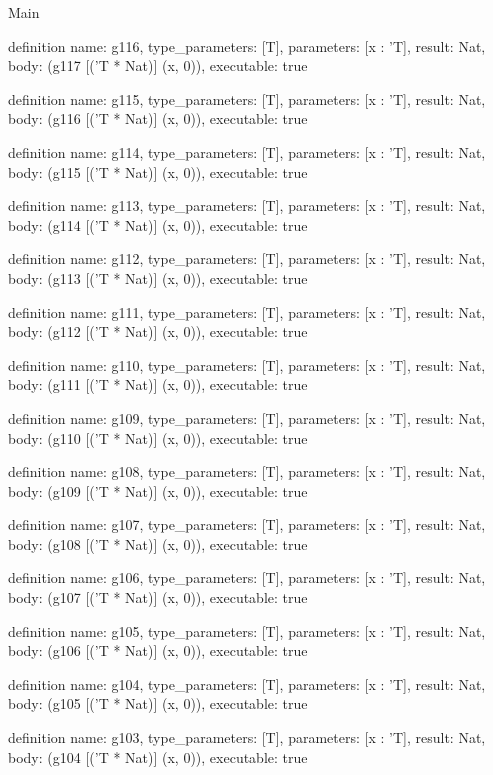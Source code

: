 \begin{lexlean}{Main}
\begin{semanticmodule}
definition{
  name: g116,
  type_parameters: [T],
  parameters: [x : 'T],
  result: Nat,
  body: (g117 [('T * Nat)] (x, 0)),
  executable: true
}

definition{
  name: g115,
  type_parameters: [T],
  parameters: [x : 'T],
  result: Nat,
  body: (g116 [('T * Nat)] (x, 0)),
  executable: true
}

definition{
  name: g114,
  type_parameters: [T],
  parameters: [x : 'T],
  result: Nat,
  body: (g115 [('T * Nat)] (x, 0)),
  executable: true
}

definition{
  name: g113,
  type_parameters: [T],
  parameters: [x : 'T],
  result: Nat,
  body: (g114 [('T * Nat)] (x, 0)),
  executable: true
}

definition{
  name: g112,
  type_parameters: [T],
  parameters: [x : 'T],
  result: Nat,
  body: (g113 [('T * Nat)] (x, 0)),
  executable: true
}

definition{
  name: g111,
  type_parameters: [T],
  parameters: [x : 'T],
  result: Nat,
  body: (g112 [('T * Nat)] (x, 0)),
  executable: true
}

definition{
  name: g110,
  type_parameters: [T],
  parameters: [x : 'T],
  result: Nat,
  body: (g111 [('T * Nat)] (x, 0)),
  executable: true
}

definition{
  name: g109,
  type_parameters: [T],
  parameters: [x : 'T],
  result: Nat,
  body: (g110 [('T * Nat)] (x, 0)),
  executable: true
}

definition{
  name: g108,
  type_parameters: [T],
  parameters: [x : 'T],
  result: Nat,
  body: (g109 [('T * Nat)] (x, 0)),
  executable: true
}

definition{
  name: g107,
  type_parameters: [T],
  parameters: [x : 'T],
  result: Nat,
  body: (g108 [('T * Nat)] (x, 0)),
  executable: true
}

definition{
  name: g106,
  type_parameters: [T],
  parameters: [x : 'T],
  result: Nat,
  body: (g107 [('T * Nat)] (x, 0)),
  executable: true
}

definition{
  name: g105,
  type_parameters: [T],
  parameters: [x : 'T],
  result: Nat,
  body: (g106 [('T * Nat)] (x, 0)),
  executable: true
}

definition{
  name: g104,
  type_parameters: [T],
  parameters: [x : 'T],
  result: Nat,
  body: (g105 [('T * Nat)] (x, 0)),
  executable: true
}

definition{
  name: g103,
  type_parameters: [T],
  parameters: [x : 'T],
  result: Nat,
  body: (g104 [('T * Nat)] (x, 0)),
  executable: true
}


\end{semanticmodule}
\end{lexlean}
